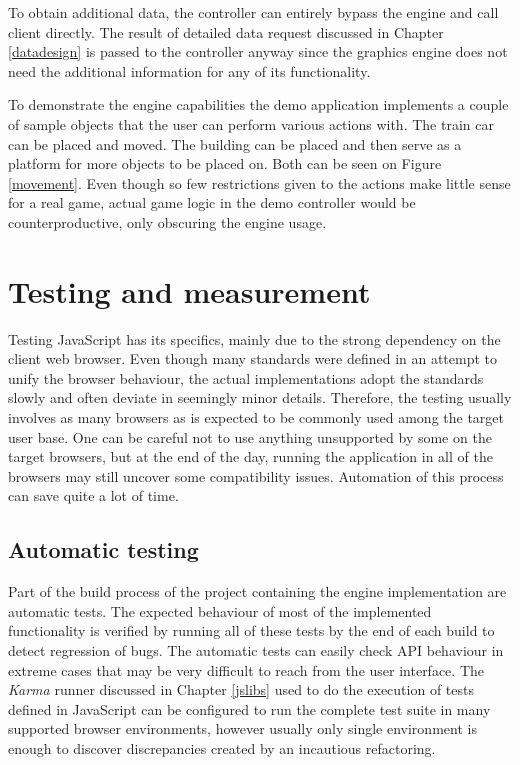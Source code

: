 \documentclass[11pt,oneside, final]{fithesis2}
\begin{document}
To obtain additional data, the controller can entirely bypass the engine and call client directly. The result of detailed data request discussed in Chapter \ref{datadesign} is passed to the controller anyway since the graphics engine does not need the additional information for any of its functionality.

To demonstrate the engine capabilities the demo application implements a couple of sample objects that the user can perform various actions with. The train car can be placed and moved. The building can be placed and then serve as a platform for more objects to be placed on. Both can be seen on Figure \ref{movement}. Even though so few restrictions given to the actions make little sense for a real game, actual game logic in the demo controller would be counterproductive, only obscuring the engine usage.

\chapter{Testing and measurement}
\label{testing}
Testing JavaScript has its specifics, mainly due to the strong dependency on the client web browser. Even though many standards were defined in an attempt to unify the browser behaviour, the actual implementations adopt the standards slowly and often deviate in seemingly minor details. Therefore, the testing usually involves as many browsers as is expected to be commonly used among the target user base. One can be careful not to use anything unsupported by some on the target browsers, but at the end of the day, running the application in all of the browsers may still uncover some compatibility issues. Automation of this process can save quite a lot of time. 

\section{Automatic testing}
Part of the build process of the project containing the engine implementation are automatic tests. The expected behaviour of most of the implemented functionality is verified by running all of these tests by the end of each build to detect regression of bugs. The automatic tests can easily check API behaviour in extreme cases that may be very difficult to reach from the user interface. The \emph{Karma} runner discussed in Chapter \ref{jslibs} used to do the execution of tests defined in JavaScript can be configured to run the complete test suite in many supported browser environments, however usually only single environment is enough to discover discrepancies created by an incautious refactoring. 
\end{document}

